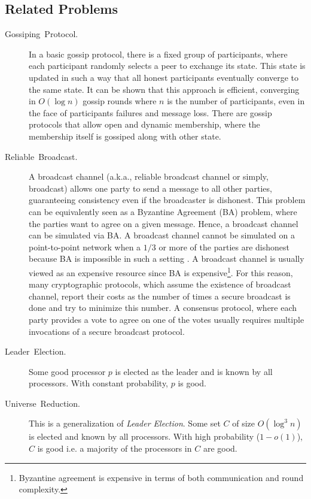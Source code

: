 \documentclass[11pt]{article}
\theoremstyle{plain}
\begin{document}
\subsection{Related Problems}
\begin{description}
	\item [{Gossiping~Protocol.}] In a basic gossip protocol, there is a fixed
	group of participants, where each participant randomly selects a peer
	to exchange its state. This state is updated in such a way that all
	honest participants eventually converge to the same state. It can
	be shown that this approach is efficient, converging in $O(\log n)$
	gossip rounds where $n$ is the number of participants, even in the
	face of participants failures and message loss. There are gossip protocols
	that allow open and dynamic membership, where the membership itself
	is gossiped along with other state.
	\item [{Reliable~Broadcast.}] A broadcast channel (a.k.a., reliable broadcast
	channel or simply, broadcast) allows one party to send a message to
	all other parties, guaranteeing consistency even if the broadcaster
	is dishonest. This problem can be equivalently seen as a Byzantine
	Agreement (BA) problem, where the parties want to agree on a given
	message. Hence, a broadcast channel can be simulated via BA. A broadcast
	channel cannot be simulated on a point-to-point network when a $1/3$
	or more of the parties are dishonest because BA is impossible in such
	a setting \cite{lsp82}. A broadcast channel is usually viewed as
	an expensive resource since BA is expensive\footnote{Byzantine agreement is expensive in terms of both communication and
		round complexity.}. For this reason, many cryptographic protocols, which assume the
	existence of broadcast channel, report their costs as the number of
	times a secure broadcast is done and try to minimize this number.
	A consensus protocol, where each party provides a vote to agree on
	one of the votes usually requires multiple invocations of a secure
	broadcast protocol.
	\item [{Leader~Election.}] Some good processor $p$ is elected as the
	leader and is known by all processors. With constant probability,
	$p$ is good.
	\item [{Universe~Reduction.}] This is a generalization of \emph{Leader
		Election}. Some set $C$ of size $O(\log^{3}{n})$ is elected and
	known by all processors. With high probability ($1-o(1)$), $C$ is
	good i.e. a majority of the processors in $C$ are good.
\end{description}
\end{document}

